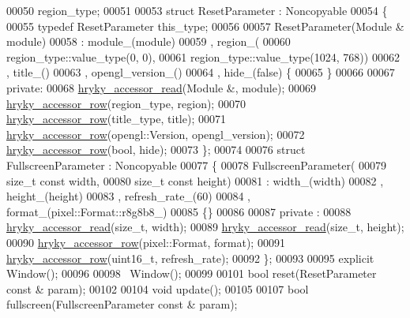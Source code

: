 \begin{DoxyCode}
00050         region\_type;
00051 
00053     \textcolor{keyword}{struct }ResetParameter : Noncopyable
00054     \{
00055         \textcolor{keyword}{typedef} ResetParameter this\_type;
00056         
00057         ResetParameter(Module & module)
00058             : module\_(module)
00059               , region\_(
00060                   region\_type::value\_type(0, 0),
00061                   region\_type::value\_type(1024, 768))
00062               , title\_()
00063               , opengl\_version\_()
00064               , hide\_(false) \{
00065         \}
00066         
00067     \textcolor{keyword}{private}:
00068         \hyperlink{common_8h_aa006947a022e09b05cfdf88588cd72eb}{hryky_accessor_read}(Module &,           module);
00069         \hyperlink{common_8h_a53c1a7f63ecaf9a35fedc7c6ca996e84}{hryky_accessor_row}(region\_type,         region);
00070         \hyperlink{common_8h_a53c1a7f63ecaf9a35fedc7c6ca996e84}{hryky_accessor_row}(title\_type,          title);
00071         \hyperlink{common_8h_a53c1a7f63ecaf9a35fedc7c6ca996e84}{hryky_accessor_row}(opengl::Version,     opengl\_version);
00072         \hyperlink{common_8h_a53c1a7f63ecaf9a35fedc7c6ca996e84}{hryky_accessor_row}(\textcolor{keywordtype}{bool},                hide);
00073     \};
00074 
00076     \textcolor{keyword}{struct }FullscreenParameter : Noncopyable
00077     \{
00078         FullscreenParameter(
00079             \textcolor{keywordtype}{size\_t} \textcolor{keyword}{const} width,
00080             \textcolor{keywordtype}{size\_t} \textcolor{keyword}{const} height)
00081             : width\_(width)
00082               , height\_(height)
00083               , refresh\_rate\_(60)
00084               , format\_(pixel::Format::r8g8b8\_)
00085         \{\}
00086         
00087     \textcolor{keyword}{private} :
00088         \hyperlink{common_8h_aa006947a022e09b05cfdf88588cd72eb}{hryky_accessor_read}(\textcolor{keywordtype}{size\_t}, width);
00089         \hyperlink{common_8h_aa006947a022e09b05cfdf88588cd72eb}{hryky_accessor_read}(\textcolor{keywordtype}{size\_t}, height);
00090         \hyperlink{common_8h_a53c1a7f63ecaf9a35fedc7c6ca996e84}{hryky_accessor_row}(pixel::Format, format);
00091         \hyperlink{common_8h_a53c1a7f63ecaf9a35fedc7c6ca996e84}{hryky_accessor_row}(uint16\_t, refresh\_rate);
00092     \};
00093 
00095     \textcolor{keyword}{explicit} Window();
00096 
00098     ~Window();
00099 
00101     \textcolor{keywordtype}{bool} reset(ResetParameter \textcolor{keyword}{const} & param);
00102 
00104     \textcolor{keywordtype}{void} update();
00105 
00107     \textcolor{keywordtype}{bool} fullscreen(FullscreenParameter \textcolor{keyword}{const} & param);

\end{DoxyCode}
